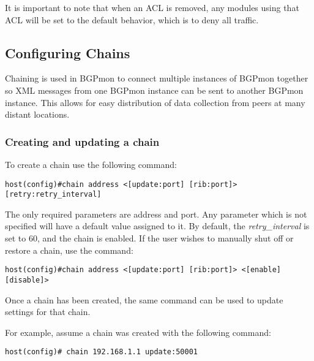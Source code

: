It is important to note that when an ACL is removed, any modules using that ACL will be set to the default behavior, which is to deny all traffic.

\subsection{Configuring Chains}
\label{sec:configure:chains}

Chaining is used in BGPmon to connect multiple instances of BGPmon together so XML messages from one BGPmon instance can be sent to another BGPmon instance.  This allows for easy distribution of data collection from peers at many distant locations.

\subsubsection{Creating and updating a chain}
\label{sec:configure:chains:createupdate}

To create a chain use the following command:\\

\begin{Verbatim}[frame=single]
host(config)#chain address <[update:port] [rib:port]> [retry:retry_interval]
\end{Verbatim}

The only required parameters are address and port.  Any parameter which is not specified will have a default value assigned to it.  By default, the \emph{retry\_interval} is set to 60, and the chain is enabled.  If the user wishes to manually shut off or restore a chain, use the command:\\

\begin{Verbatim}[frame=single]
host(config)#chain address <[update:port] [rib:port]> <[enable] [disable]>
\end{Verbatim}

Once a chain has been created, the same command can be used to update settings for that chain.  

For example, assume a chain was created with the following command:\\

\begin{Verbatim}[frame=single]
host(config)# chain 192.168.1.1 update:50001
\end{Verbatim}

